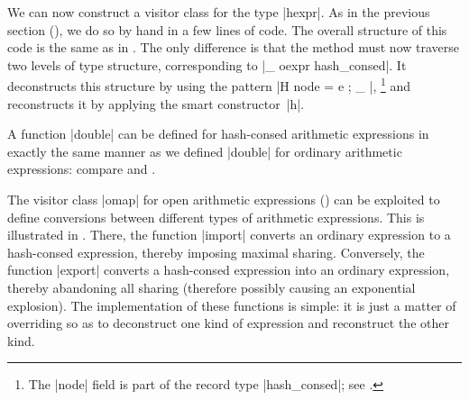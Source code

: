 \documentclass[11pt,a4paper,twoside]{article}
\begin{document}
We can now construct a visitor class for the type \oc|hexpr|. As in the previous
section (), we do so by hand in a few lines of code.
%
%
%
The overall structure of this code is the same as in . The
only difference is that the method  must now traverse
two levels of type structure, corresponding to \oc|_ oexpr hash_consed|.
It deconstructs this structure by using the pattern \oc|H { node = e ; _ }|,%
%
\footnote{The \oc|node| field is part of the record type \oc|hash_consed|;
see .}
%
and reconstructs it by applying the smart constructor~\oc|h|.

A function \oc|double| can be defined for hash-consed arithmetic expressions
in exactly the same manner as we defined \oc|double| for ordinary arithmetic
expressions: compare  and .
%
%

The visitor class \oc|omap| for open arithmetic expressions
() can be exploited to define conversions
between different types of arithmetic expressions.
This is illustrated in .
There, the function \oc|import| converts an ordinary expression
to a hash-consed expression, thereby imposing maximal sharing.
Conversely, the function \oc|export| converts a hash-consed
expression into an ordinary expression, thereby abandoning
all sharing (therefore possibly causing an exponential explosion).
The implementation of these functions is simple: it is just
a matter of overriding  so as to deconstruct
one kind of expression and reconstruct the other kind.




\end{document}
